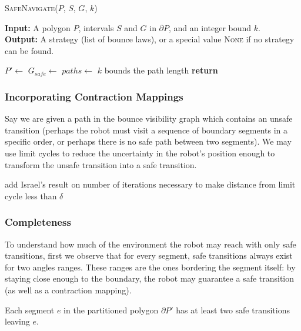 \documentclass[]{styles/svproc}  %
\begin{document}
\begin{algorithm}
\caption{\textsc{SafeNavigate}($P$, $S$, $G$, $k$)}
\label{algo:nav}
\hspace*{\algorithmicindent} \textbf{Input:} A polygon $P$, intervals $S$ and
$G$ in $\partial P$, and an integer bound $k$.\\
\hspace*{\algorithmicindent} \textbf{Output:} A strategy (list of bounce laws),
or a special value \textsc{None} if no strategy can be found.
\begin{algorithmic}[1]
\State $P' \gets$ 
\State $G_{safe} \gets$ 
\State $paths \gets$ 
\Comment $k$ bounds the path length
\State \textbf{return} 
\end{algorithmic}
\end{algorithm}


\subsubsection{Incorporating Contraction Mappings}

Say we are given a path in the bounce visibility graph which contains an unsafe
transition (perhaps the robot must visit a sequence of boundary segments in a
specific order, or perhaps there is no safe path between two segments). We may
use limit cycles to reduce the uncertainty in the robot's position enough to
transform the unsafe transition into a safe transition.

{\color{red} add Israel's result on number of iterations necessary to make distance from
limit cycle less than $\delta$}

\subsubsection{Completeness}

To understand how much of the environment the robot may reach with only safe
transitions, first we observe that for every segment, safe transitions always exist
for two angles ranges. These ranges are the ones bordering the segment itself:
by staying close enough to the boundary, the robot may guarantee a safe
transition (as well as a contraction mapping).

\begin{lemma} \label{lemma:twosafe}
Each segment $e$ in the partitioned polygon $\partial P'$ has at least two safe transitions
leaving $e$.
\end{lemma}
\end{document}
